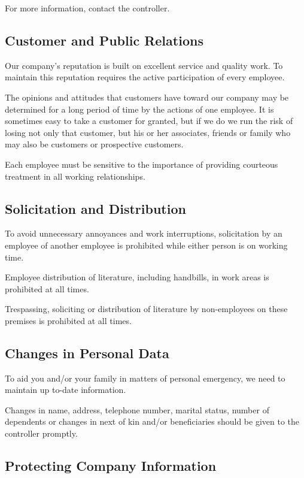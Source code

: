 \documentclass{book}
\begin{document}
For more information, contact the controller.

\subsection{Customer and Public Relations}

Our company's reputation is built on excellent service and quality work. To maintain this reputation requires the active participation of every employee.

The opinions and attitudes that customers have toward our company may be determined for a long period of time by the actions of one employee. It is sometimes easy to take a customer for granted, but if we do we run the risk of losing not only that customer, but his or her associates, friends or family who may also be customers or prospective customers.

Each employee must be sensitive to the importance of providing courteous treatment in all working relationships.

\subsection{Solicitation and Distribution}

To avoid unnecessary annoyances and work interruptions, solicitation by an employee of another employee is prohibited while either person is on working time.

Employee distribution of literature, including handbills, in work areas is prohibited at all times.

Trespassing, soliciting or distribution of literature by non-employees on these premises is prohibited at all times.

\subsection{Changes in Personal Data}

To aid you and/or your family in matters of personal emergency, we need to maintain up to-date information.

Changes in name, address, telephone number, marital status, number of dependents or changes in next of kin and/or beneficiaries should be given to the controller promptly.

\subsection{Protecting Company Information}
\end{document}
